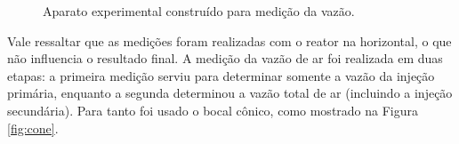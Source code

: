 \begin{figure}[!ht]
	\centering
	\caption{Aparato experimental construído para medição da vazão.}
	\label{fig:aparato}
\end{figure}

Vale ressaltar que as medições foram realizadas com o reator na horizontal, o que não influencia o resultado final. A medição da vazão de ar foi realizada em duas etapas: a primeira medição serviu para determinar somente a vazão da injeção primária, enquanto a segunda determinou a vazão total de ar (incluindo a injeção secundária). Para tanto foi usado o bocal cônico, como mostrado na Figura \ref{fig:cone}.

